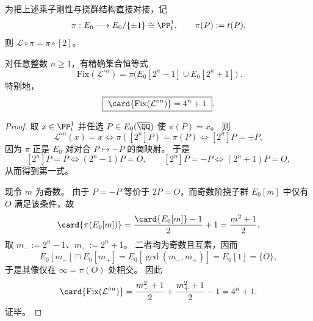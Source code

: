 为把上述乘子刚性与挠群结构直接对接，记
\[
\pi:E_0\longrightarrow E_0/\{\pm1\}\cong \PP^1_t,\qquad \pi(P):=t(P),
\]
则 \(\mathcal L\circ \pi=\pi\circ [2]\)。

\begin{theorem}[迭代不动点的奇阶挠点刻画]\label{thm:xi-j-sextic-elliptic-lattes-fixedpoints-odd-torsion}
对任意整数 \(n\ge 1\)，有精确集合恒等式
\[
\boxed{\ \mathrm{Fix}(\mathcal L^{\circ n})
=\pi\bigl(E_0[2^n-1]\cup E_0[2^n+1]\bigr)\ }.
\]
特别地，
\[
\boxed{\ \card{\mathrm{Fix}(\mathcal L^{\circ n})}=4^n+1\ }.
\]
\end{theorem}
\begin{proof}
取 \(x\in \PP^1_t\) 并任选 \(P\in E_0(\overline{\QQ})\) 使 \(\pi(P)=x\)。
则
\[
\mathcal L^{\circ n}(x)=x
\iff
\pi([2^n]P)=\pi(P)
\iff
[2^n]P=\pm P,
\]
因为 \(\pi\) 正是 \(E_0\) 对对合 \(P\mapsto -P\) 的商映射。
于是
\[
[2^n]P=P \iff (2^n-1)P=O,\qquad
[2^n]P=-P \iff (2^n+1)P=O,
\]
从而得到第一式。
\par
现令 \(m\) 为奇数。
由于 \(P=-P\) 等价于 \(2P=O\)，而奇数阶挠子群 \(E_0[m]\) 中仅有 \(O\) 满足该条件，故
\[
\card{\pi(E_0[m])}
=\frac{\card{E_0[m]}-1}{2}+1
=\frac{m^2+1}{2}.
\]
取 \(m_-:=2^n-1\)、\(m_+:=2^n+1\)。
二者均为奇数且互素，因而
\[
E_0[m_-]\cap E_0[m_+]=E_0[\gcd(m_-,m_+)]=E_0[1]=\{O\},
\]
于是其像仅在 \(\infty=\pi(O)\) 处相交。
因此
\[
\card{\mathrm{Fix}(\mathcal L^{\circ n})}
=\frac{m_-^2+1}{2}+\frac{m_+^2+1}{2}-1
=4^n+1.
\]
证毕。
\end{proof}

